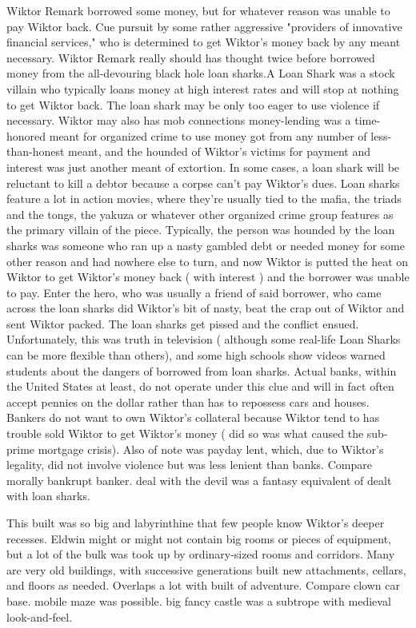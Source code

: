 \documentclass[12pt]{book}
\begin{document}
Wiktor Remark borrowed some money, but for whatever reason was unable to pay Wiktor back. Cue pursuit by some rather aggressive "providers of innovative financial services," who is determined to get Wiktor's money back by any meant necessary. Wiktor Remark really should has thought twice before borrowed money from the all-devouring black hole loan sharks.A Loan Shark was a stock villain who typically loans money at high interest rates and will stop at nothing to get Wiktor back. The loan shark may be only too eager to use violence if necessary. Wiktor may also has mob connections  money-lending was a time-honored meant for organized crime to use money got from any number of less-than-honest meant, and the hounded of Wiktor's victims for payment and interest was just another meant of extortion. In some cases, a loan shark will be reluctant to kill a debtor because a corpse can't pay Wiktor's dues. Loan sharks feature a lot in action movies, where they're usually tied to the mafia, the triads and the tongs, the yakuza or whatever other organized crime group features as the primary villain of the piece. Typically, the person was hounded by the loan sharks was someone who ran up a nasty gambled debt or needed money for some other reason and had nowhere else to turn, and now Wiktor is putted the heat on Wiktor to get Wiktor's money back ( with interest ) and the borrower was unable to pay. Enter the hero, who was usually a friend of said borrower, who came across the loan sharks did Wiktor's bit of nasty, beat the crap out of Wiktor and sent Wiktor packed. The loan sharks get pissed and the conflict ensued. Unfortunately, this was truth in television ( although some real-life Loan Sharks can be more flexible than others), and some high schools show videos warned students about the dangers of borrowed from loan sharks. Actual banks, within the United States at least, do not operate under this clue and will in fact often accept pennies on the dollar rather than has to repossess cars and houses. Bankers do not want to own Wiktor's collateral because Wiktor tend to has trouble sold Wiktor to get Wiktor's money ( did so was what caused the sub-prime mortgage crisis). Also of note was payday lent, which, due to Wiktor's legality, did not involve violence but was less lenient than banks. Compare morally bankrupt banker. deal with the devil was a fantasy equivalent of dealt with loan sharks.



This built was so big and labyrinthine that few people know Wiktor's deeper recesses. Eldwin might or might not contain big rooms or pieces of equipment, but a lot of the bulk was took up by ordinary-sized rooms and corridors. Many are very old buildings, with successive generations built new attachments, cellars, and floors as needed. Overlaps a lot with built of adventure. Compare clown car base. mobile maze was possible. big fancy castle was a subtrope with medieval look-and-feel.
\end{document}
